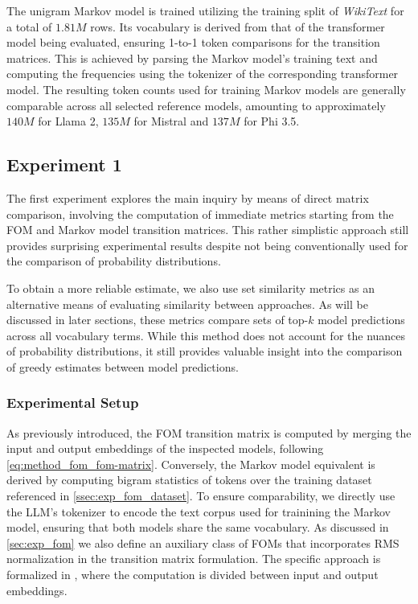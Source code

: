 The unigram Markov model is trained utilizing the training split of \emph{WikiText} for a total of $1.81M$ rows.
Its vocabulary is derived from that of the transformer model being evaluated, ensuring 1-to-1 token comparisons for the transition matrices.
This is achieved by parsing the Markov model's training text and computing the frequencies using the tokenizer of the corresponding transformer model.
The resulting token counts used for training Markov models are generally comparable across all selected reference models, amounting to approximately $140M$ for Llama 2, $135M$ for Mistral and $137M$ for Phi 3.5.

\subsection{Experiment 1}\label{ssec:exp_fom_exp1}

The first experiment explores the main inquiry by means of direct matrix comparison, involving the computation of immediate metrics starting from the FOM and Markov model transition matrices.
This rather simplistic approach still provides surprising experimental results despite not being conventionally used for the comparison of probability distributions.

To obtain a more reliable estimate, we also use set similarity metrics as an alternative means of evaluating similarity between approaches.
As will be discussed in later sections, these metrics compare sets of top-$k$ model predictions across all vocabulary terms.
While this method does not account for the nuances of probability distributions, it still provides valuable insight into the comparison of greedy estimates between model predictions.

\subsubsection{Experimental Setup}

As previously introduced, the FOM transition matrix is computed by merging the input and output embeddings of the inspected models, following \cref{eq:method_fom_fom-matrix}.
Conversely, the Markov model equivalent is derived by computing bigram statistics of tokens over the training dataset referenced in \cref{ssec:exp_fom_dataset}.
To ensure comparability, we directly use the LLM's tokenizer to encode the text corpus used for trainining the Markov model, ensuring that both models share the same vocabulary.
As discussed in \cref{sec:exp_fom} we also define an auxiliary class of FOMs that incorporates RMS normalization in the transition matrix formulation.
The specific approach is formalized in , where the computation is divided between input and output embeddings.

